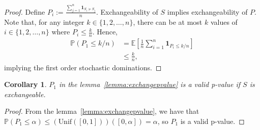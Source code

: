 \documentclass[10pt,a4paper]{amsart}
\newcommand{\expect}[1]{\mathbb{E}\left[ #1 \right]}
\newcommand{\prob}[1]{\mathbb{P}\left( #1 \right)}
\newtheorem{corollary}{Corollary}
\begin{document}
    \begin{proof}
        Define $P_i:= \frac{\sum_{j=1}^n \mathbf{1}_{S_i \succcurlyeq S_j}}{n}$. Exchangeability of $S$ implies exchangeability of $P$. Note that, for any integer $k \in \{1,2,\dots, n\}$, there can be at most $k$ values of $i \in \{1,2,\dots, n\}$ where $P_i \le \frac{k}{n}$. Hence,
        \begin{align*}
            \prob{P_1 \le k/n}
            &= \expect{\frac{1}{n}
            \sum_{i=1}^n \mathbf{1}_{P_i \le k/n}} \\
            &\le \frac{k}{n},
        \end{align*}
        implying the first order stochastic dominations.
    \end{proof}

    \begin{corollary}
    \label{corollary:validpexchange}
        $P_1$ in the lemma~\ref{lemma:exchangepvalue} is a valid p-value if $S$ is exchangeable.
    \end{corollary}
    \begin{proof}
        From the lemma~\ref{lemma:exchangepvalue}, we have that $\mathbb{P}\left(P_1 \le \alpha\right) \le \left(\text{Unif}([0,1])\right)([0, \alpha]) = \alpha$, so $P_1$ is a valid p-value.
    \end{proof}
\end{document}
